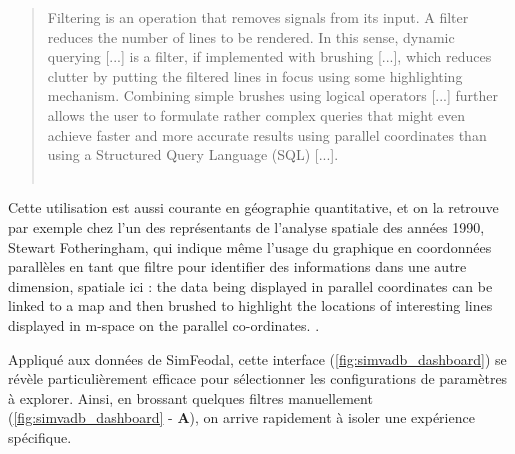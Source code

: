 	\begin{quotation}
		\og Filtering is an operation that removes signals from its input. A filter reduces the number of lines to be rendered. In 	this sense, dynamic querying [...] is a filter, if implemented with brushing [...], which reduces clutter by putting the filtered lines in focus using some highlighting mechanism. Combining simple brushes using logical operators [...] further allows the user to formulate rather complex queries that might even achieve faster and more accurate results using parallel coordinates than using a Structured Query Language (SQL) [...].\fg{}\\
		\mbox{}~ \hfill \cite[p. 13]{heinrich_state_2013}
	\end{quotation}

	Cette utilisation est aussi courante en géographie quantitative, et on la retrouve par exemple chez l'un des représentants de l'analyse spatiale des années 1990, Stewart Fotheringham, qui indique même l'usage du graphique en coordonnées parallèles en tant que filtre pour identifier des informations dans une autre dimension, spatiale ici : \og the data being displayed in parallel coordinates can be linked to a map and then brushed to highlight the locations of interesting lines displayed in m-space on the parallel co-ordinates.\fg{} \autocite{fotheringham_trends_1999}.

	Appliqué aux données de SimFeodal, cette interface (\cref{fig:simvadb_dashboard}) se révèle particulièrement efficace pour sélectionner les configurations de paramètres à explorer.
	Ainsi, en \og brossant \fg{} quelques filtres manuellement (\cref{fig:simvadb_dashboard} - \textbf{A}), on arrive rapidement à isoler une expérience spécifique.

